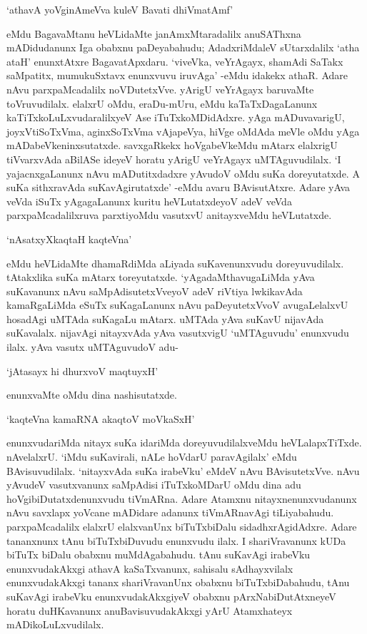 \begin{shloka}
`athavA yoVginAmeVva kuleV Bavati dhiVmatAmf'
\end{shloka}

\noindent eMdu BagavaMtanu heVLidaMte janAmxMtaradalilx anuSAThxna mADidudanunx Iga obabxnu paDeyabahudu; AdadxriMdaleV sUtarxdalilx `atha ataH' enunxtAtxre BagavatApxdaru. `viveVka, veYrAgayx, shamAdi SaTakx saMpatitx, mumukuSxtavx enunxvuvu iruvAga' -eMdu idakekx athaR. Adare nAvu parxpaMcadalilx noVDutetxVve. yArigU veYrAgayx baruvaMte toVruvudilalx. elalxrU oMdu, eraDu-mUru, eMdu kaTaTxDagaLanunx kaTiTxkoLuLxvudaralilxyeV Ase iTuTxkoMDidAdxre. yAga mADuvavarigU, joyxVtiSoTxVma, aginxSoTxVma vAjapeVya, hiVge oMdAda meVle oMdu yAga mADabeVkeninxsutatxde. savxgaRkekx hoVgabeVkeMdu mAtarx elalxrigU tiVvarxvAda aBilASe ideyeV horatu yArigU veYrAgayx uMTAguvudilalx. `I yajacnxgaLanunx nAvu mADutitxdadxre yAvudoV oMdu suKa doreyutatxde. A suKa sithxravAda suKavAgirutatxde' -eMdu avaru BAvisutAtxre. Adare yAva veVda iSuTx yAgagaLanunx kuritu heVLutatxdeyoV adeV veVda parxpaMcadalilxruva parxtiyoMdu vasutxvU anitayxveMdu heVLutatxde.

\begin{shloka}
`nAsatxyXkaqtaH kaqteVna'
\end{shloka}

\noindent eMdu heVLidaMte dhamaRdiMda aLiyada suKavenunxvudu doreyuvudilalx. tAtakxlika suKa mAtarx toreyutatxde. `yAgadaMthavugaLiMda yAva suKavanunx nAvu saMpAdisutetxVveyoV adeV riVtiya lwkikavAda kamaRgaLiMda eSuTx suKagaLanunx nAvu paDeyutetxVvoV avugaLelalxvU hosadAgi uMTAda suKagaLu mAtarx. uMTAda yAva suKavU nijavAda suKavalalx. nijavAgi nitayxvAda yAva vasutxvigU `uMTAguvudu' enunxvudu ilalx. yAva vasutx uMTAguvudoV adu-

\begin{shloka}
`jAtasayx hi dhurxvoV maqtuyxH'
\end{shloka}

enunxvaMte oMdu dina nashisutatxde.

\begin{shloka}
`kaqteVna kamaRNA akaqtoV moVkaSxH'
\end{shloka}

\noindent enunxvudariMda nitayx suKa idariMda doreyuvudilalxveMdu heVLalapxTiTxde. nAvelalxrU. `iMdu suKavirali, nALe hoVdarU paravAgilalx' eMdu BAvisuvudilalx. `nitayxvAda suKa irabeVku' eMdeV nAvu BAvisutetxVve. nAvu yAvudeV vasutxvanunx saMpAdisi iTuTxkoMDarU oMdu dina adu hoVgibiDutatxdenunxvudu tiVmARna. Adare Atamxnu nitayxnenunxvudanunx nAvu savxlapx yoVcane mADidare adanunx tiVmARnavAgi tiLiyabahudu. parxpaMcadalilx elalxrU elalxvanUnx biTuTxbiDalu sidadhxrAgidAdxre. Adare tananxnunx tAnu biTuTxbiDuvudu enunxvudu ilalx. I shariVravanunx kUDa biTuTx biDalu obabxnu muMdAgabahudu. tAnu suKavAgi irabeVku enunxvudakAkxgi athavA kaSaTxvanunx, sahisalu sAdhayxvilalx enunxvudakAkxgi tananx shariVravanUnx obabxnu biTuTxbiDabahudu, tAnu suKavAgi irabeVku enunxvudakAkxgiyeV obabxnu pArxNabiDutAtxneyeV horatu duHKavanunx anuBavisuvudakAkxgi yArU Atamxhateyx mADikoLuLxvudilalx.

